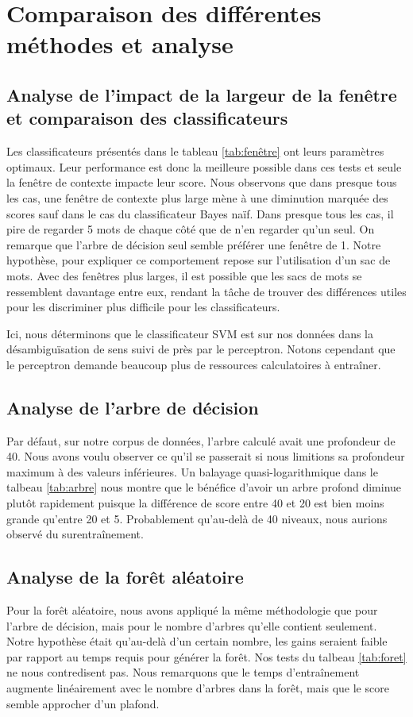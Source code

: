 \documentclass[11pt]{rapport-tp-ia}
\begin{document}
\vspace{3em}
\newpage  %
\chapter{Comparaison des différentes méthodes et analyse}

\section{Analyse de l'impact de la largeur de la fenêtre et comparaison des classificateurs}
Les classificateurs présentés dans le tableau \ref{tab:fenêtre} ont leurs paramètres optimaux.
Leur performance est donc la meilleure possible dans ces tests et seule la fenêtre de contexte impacte leur score.
Nous observons que dans presque tous les cas, une fenêtre de contexte plus large mène à une diminution marquée des scores sauf dans le cas du classificateur Bayes naïf.
Dans presque tous les cas, il pire de regarder 5 mots de chaque côté que de n'en regarder qu'un seul.
On remarque que l'arbre de décision seul semble préférer une fenêtre de 1.
Notre hypothèse, pour expliquer ce comportement repose sur l'utilisation d'un sac de mots.
Avec des fenêtres plus larges, il est possible que les sacs de mots se ressemblent davantage entre eux, rendant la tâche de trouver des différences utiles pour les discriminer plus difficile pour les classificateurs.


Ici, nous déterminons que le classificateur SVM est sur nos données dans la désambiguïsation de sens suivi de près par le perceptron.
Notons cependant que le perceptron demande beaucoup plus de ressources calculatoires à entraîner.

\section{Analyse de l'arbre de décision}
Par défaut, sur notre corpus de données, l'arbre calculé avait une profondeur de 40.
Nous avons voulu observer ce qu'il se passerait si nous limitions sa profondeur maximum à des valeurs inférieures.
Un balayage quasi-logarithmique dans le talbeau \ref{tab:arbre} nous montre que le bénéfice d'avoir un arbre profond diminue plutôt rapidement puisque la différence de score entre 40 et 20 est bien moins grande qu'entre 20 et 5.
Probablement qu'au-delà de 40 niveaux, nous aurions observé du surentraînement.

\section{Analyse de la forêt aléatoire}
Pour la forêt aléatoire, nous avons appliqué la même méthodologie que pour l'arbre de décision, mais pour le nombre d'arbres qu'elle contient seulement.
Notre hypothèse était qu'au-delà d'un certain nombre, les gains seraient faible par rapport au temps requis pour générer la forêt.
Nos tests du talbeau \ref{tab:foret} ne nous contredisent pas.
Nous remarquons que le temps d'entraînement augmente linéairement avec le nombre d'arbres dans la forêt, mais que le score semble approcher d'un plafond.
\end{document}
